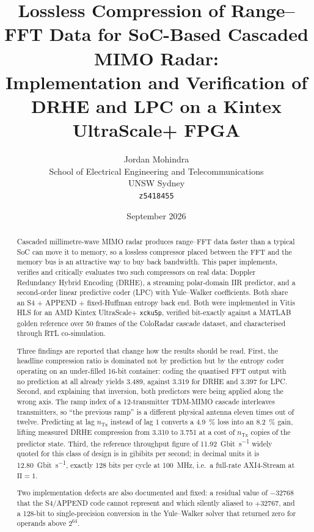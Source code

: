 \documentclass[10pt,twocolumn]{article}
\title{\Large\bfseries Lossless Compression of Range--FFT Data for
SoC-Based Cascaded MIMO Radar:\\
Implementation and Verification of DRHE and LPC on a Kintex UltraScale+ FPGA}
\author{Jordan Mohindra\\[2pt]
\small School of Electrical Engineering and Telecommunications\\
\small UNSW Sydney\\
\small \texttt{z5418455}}
\date{September 2026}
\begin{document}
\maketitle

\begin{abstract}
\noindent
Cascaded millimetre-wave MIMO radar produces range--FFT data faster than a
typical SoC can move it to memory, so a lossless compressor placed between the
FFT and the memory bus is an attractive way to buy back bandwidth. This paper
implements, verifies and critically evaluates two such compressors on real
data: Doppler Redundancy Hybrid Encoding (DRHE), a streaming polar-domain IIR
predictor, and a second-order linear predictive coder (LPC) with Yule--Walker
coefficients. Both share an S4 + APPEND + fixed-Huffman entropy back end. Both
were implemented in Vitis HLS for an AMD Kintex UltraScale+ \texttt{xcku5p},
verified bit-exactly against a MATLAB golden reference over 50 frames of the
ColoRadar cascade dataset, and characterised through RTL co-simulation.

Three findings are reported that change how the results should be read. First,
the headline compression ratio is dominated not by prediction but by the
entropy coder operating on an under-filled 16-bit container: coding the
quantised FFT output with no prediction at all already yields
\num{3.489}, against \num{3.319} for DRHE and \num{3.397} for LPC. Second, and
explaining that inversion, both predictors were being applied along the wrong
axis. The ramp index of a 12-transmitter TDM-MIMO cascade interleaves
transmitters, so ``the previous ramp'' is a different physical antenna eleven
times out of twelve. Predicting at lag $n_{\mathrm{Tx}}$ instead of lag 1
converts a \SI{4.9}{\percent} loss into an \SI{8.2}{\percent} gain, lifting
measured DRHE compression from \num{3.310} to \num{3.751} at a cost of
$n_{\mathrm{Tx}}$ copies of the predictor state. Third, the reference
throughput figure of \SI{11.92}{Gbit\per\second} widely quoted for this class of
design is in gibibits per second; in decimal units it is
\SI{12.80}{Gbit\per\second}, exactly \num{128} bits per cycle at
\SI{100}{\mega\hertz}, i.e.\ a full-rate AXI4-Stream at $\mathrm{II}=1$.

Two implementation defects are also documented and fixed: a residual value of
$-32768$ that the S4/APPEND code cannot represent and which silently aliased to
$+32767$, and a 128-bit to single-precision conversion in the Yule--Walker
solver that returned zero for operands above $2^{64}$.
\end{abstract}
\end{document}
